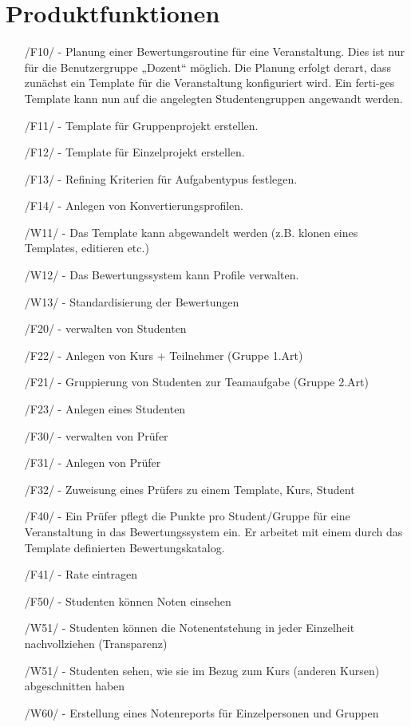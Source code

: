 	\section{Produktfunktionen}
	\begin{itemize}
	\item[/F10/]   -  Planung einer Bewertungsroutine für eine Veranstaltung. Dies ist nur für die Benutzergruppe „Dozent“ möglich.  Die Planung erfolgt derart, dass zunächst ein Template für die Veranstaltung konfiguriert wird. Ein ferti-ges Template kann nun auf die angelegten Studentengruppen angewandt werden. 
		
			\item[/F11/] - Template für Gruppenprojekt erstellen.
			\item[/F12/] - Template für Einzelprojekt erstellen.
			\item[/F13/] - Refining Kriterien für Aufgabentypus festlegen.	
			\item[/F14/] - Anlegen von Konvertierungsprofilen. 
		\item[/W11/] - Das Template kann abgewandelt werden (z.B. klonen eines Templates, editieren etc.)
			\item[/W12/] - Das Bewertungssystem kann Profile verwalten. 
			\item[/W13/] - Standardisierung der Bewertungen
			
		\item[/F20/] - verwalten von Studenten
			\item[/F22/] - Anlegen von Kurs + Teilnehmer (Gruppe 1.Art)
			\item[/F21/] - Gruppierung von Studenten zur Teamaufgabe (Gruppe 2.Art)
			\item[/F23/] - Anlegen eines  Studenten
		
		\item[/F30/] - verwalten von Prüfer
			\item[/F31/] - Anlegen von Prüfer
			\item[/F32/] - Zuweisung eines Prüfers zu einem Template, Kurs, Student
		
		\item[/F40/] - Ein Prüfer pflegt die Punkte pro Student/Gruppe für eine Veranstaltung in das Bewertungssystem ein. Er arbeitet mit einem durch das Template definierten Bewertungskatalog.
			\item[/F41/] - Rate eintragen
			
		\item[/F50/] - Studenten können Noten einsehen
			\item[/W51/] - Studenten können die Notenentstehung in jeder Einzelheit nachvollziehen (Transparenz)
			\item[/W51/] - Studenten sehen, wie sie im Bezug zum Kurs (anderen Kursen) abgeschnitten haben
		\item[/W60/] - Erstellung eines Notenreports für Einzelpersonen und Gruppen
	\end{itemize}
	
